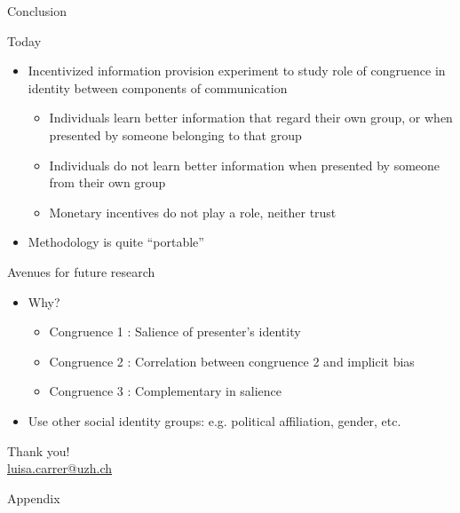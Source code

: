 \documentclass[10pt]{beamer}
\begin{document}
\begin{frame}{Conclusion}
\begin{block}{Today}
\begin{itemize}
    \item Incentivized information provision experiment to study role of congruence in identity between components of communication
    \begin{itemize}
    \item Individuals learn better information that regard their own group, or when presented by someone belonging to that group
    \item Individuals do not learn better information when presented by someone from their own group
    \item Monetary incentives do not play a role, neither trust
    \end{itemize}
    \item Methodology is quite “portable”
\end{itemize}
\end{block}
\begin{block}{Avenues for future research }
\begin{itemize}
    \item Why?
    \begin{itemize}
    \item Congruence 1 : Salience of presenter's identity
    \item Congruence 2 : Correlation between congruence 2 and implicit bias 
    \item Congruence 3 : Complementary in salience
    \end{itemize}
    \item Use other social identity groups: e.g. political affiliation, gender, etc.
\end{itemize}
\end{block}
\end{frame}



\begin{frame}[standout]
Thank you!\\
\vspace{1cm}
\large{\url{luisa.carrer@uzh.ch}}

\end{frame}

\appendix
{
\begin{frame}{}
    Appendix
\end{frame}
}
\end{document}
